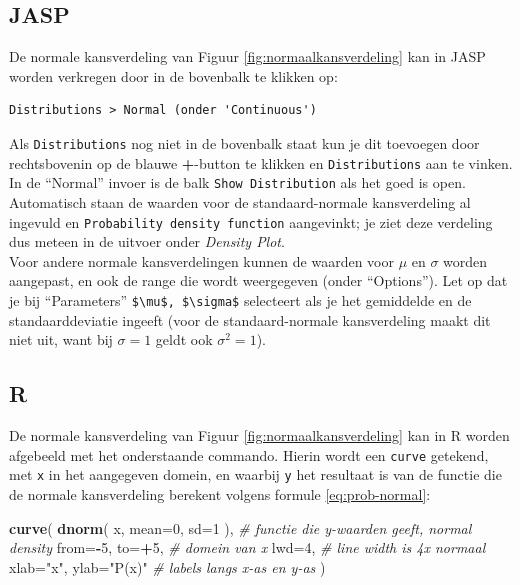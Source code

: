 \documentclass[
]{book}
\newenvironment{Shaded}{\begin{snugshade}}{\end{snugshade}}
\newcommand{\CommentTok}[1]{\textcolor[rgb]{0.56,0.35,0.01}{\textit{#1}}}
\newcommand{\DataTypeTok}[1]{\textcolor[rgb]{0.13,0.29,0.53}{#1}}
\newcommand{\DecValTok}[1]{\textcolor[rgb]{0.00,0.00,0.81}{#1}}
\newcommand{\KeywordTok}[1]{\textcolor[rgb]{0.13,0.29,0.53}{\textbf{#1}}}
\newcommand{\NormalTok}[1]{#1}
\newcommand{\OperatorTok}[1]{\textcolor[rgb]{0.81,0.36,0.00}{\textbf{#1}}}
\newcommand{\StringTok}[1]{\textcolor[rgb]{0.31,0.60,0.02}{#1}}
\begin{document}
\hypertarget{jasp-5}{%
\subsection{JASP}\label{jasp-5}}

De normale kansverdeling van Figuur \ref{fig:normaalkansverdeling} kan in JASP worden verkregen door in de bovenbalk te klikken op:

\begin{verbatim}
Distributions > Normal (onder 'Continuous')
\end{verbatim}

Als \texttt{Distributions} nog niet in de bovenbalk staat kun je dit toevoegen door rechtsbovenin op de blauwe \textbf{+}-button te klikken en \texttt{Distributions} aan te vinken.\\
In de ``Normal'' invoer is de balk \texttt{Show\ Distribution} als het goed is open. Automatisch staan de waarden voor de standaard-normale kansverdeling al ingevuld en \texttt{Probability\ density\ function} aangevinkt; je ziet deze verdeling dus meteen in de uitvoer onder \emph{Density Plot}.\\
Voor andere normale kansverdelingen kunnen de waarden voor \(\mu\) en \(\sigma\) worden aangepast, en ook de range die wordt weergegeven (onder ``Options''). Let op dat je bij ``Parameters'' \texttt{\$\textbackslash{}mu\$,\ \$\textbackslash{}sigma\$} selecteert als je het gemiddelde en de standaarddeviatie ingeeft (voor de standaard-normale kansverdeling maakt dit niet uit, want bij \(\sigma=1\) geldt ook \(\sigma^2=1\)).

\hypertarget{r-5}{%
\subsection{R}\label{r-5}}

De normale kansverdeling van Figuur \ref{fig:normaalkansverdeling} kan in R worden afgebeeld
met het onderstaande commando. Hierin wordt een \texttt{curve} getekend, met \texttt{x} in het aangegeven domein, en waarbij \texttt{y} het resultaat is van de functie die de normale kansverdeling berekent volgens formule \eqref{eq:prob-normal}:

\begin{Shaded}
\begin{Highlighting}[]
\KeywordTok{curve}\NormalTok{( }\KeywordTok{dnorm}\NormalTok{( x, }\DataTypeTok{mean=}\DecValTok{0}\NormalTok{, }\DataTypeTok{sd=}\DecValTok{1}\NormalTok{ ), }\CommentTok{\# functie die y{-}waarden geeft, normal density}
       \DataTypeTok{from=}\OperatorTok{{-}}\DecValTok{5}\NormalTok{, }\DataTypeTok{to=}\OperatorTok{+}\DecValTok{5}\NormalTok{, }\CommentTok{\# domein van x}
       \DataTypeTok{lwd=}\DecValTok{4}\NormalTok{, }\CommentTok{\# line width is 4x normaal}
       \DataTypeTok{xlab=}\StringTok{"x"}\NormalTok{, }\DataTypeTok{ylab=}\StringTok{"P(x)"} \CommentTok{\# labels langs x{-}as en y{-}as}
\NormalTok{       )}
\end{Highlighting}
\end{Shaded}
\end{document}
